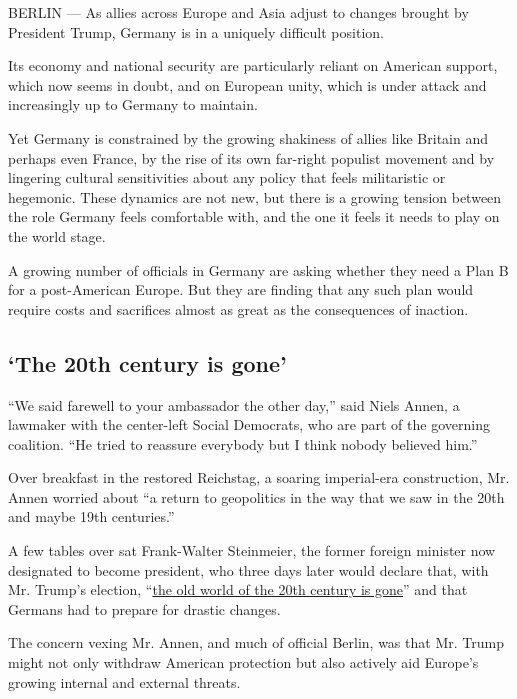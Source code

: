 BERLIN --- As allies across Europe and Asia adjust to changes brought by
President Trump, Germany is in a uniquely difficult position.

Its economy and national security are particularly reliant on American
support, which now seems in doubt, and on European unity, which is under
attack and increasingly up to Germany to maintain.

Yet Germany is constrained by the growing shakiness of allies like
Britain and perhaps even France, by the rise of its own far-right
populist movement and by lingering cultural sensitivities about any
policy that feels militaristic or hegemonic. These dynamics are not new,
but there is a growing tension between the role Germany feels
comfortable with, and the one it feels it needs to play on the world
stage.

A growing number of officials in Germany are asking whether they need a
Plan B for a post-American Europe. But they are finding that any such
plan would require costs and sacrifices almost as great as the
consequences of inaction.

\hypertarget{the-20th-century-is-gone}{%
\subsection{`The 20th century is gone'}\label{the-20th-century-is-gone}}

``We said farewell to your ambassador the other day,'' said Niels Annen,
a lawmaker with the center-left Social Democrats, who are part of the
governing coalition. ``He tried to reassure everybody but I think nobody
believed him.''

Over breakfast in the restored Reichstag, a soaring imperial-era
construction, Mr. Annen worried about ``a return to geopolitics in the
way that we saw in the 20th and maybe 19th centuries.''

A few tables over sat Frank-Walter Steinmeier, the former foreign
minister now designated to become president, who three days later would
declare that, with Mr. Trump's election,
``\href{http://www.bild.de/politik/inland/dr-frank-walter-steinmeier/die-alte-weltordnung-ist-vorueber-49896494.bild.html}{the
old world of the 20th century is gone}'' and that Germans had to prepare
for drastic changes.

The concern vexing Mr. Annen, and much of official Berlin, was that Mr.
Trump might not only withdraw American protection but also actively aid
Europe's growing internal and external threats.

